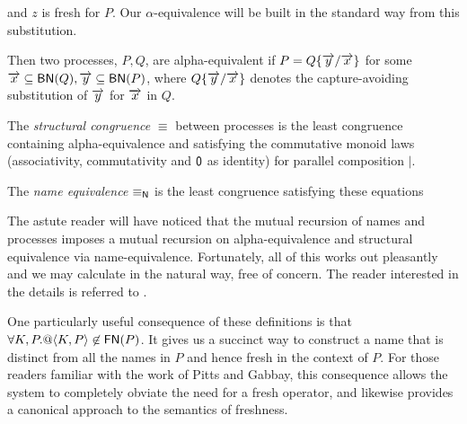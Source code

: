 and $z$ is fresh for $P$. Our $\alpha$-equivalence will be built in
the standard way from this substitution.

\begin{definition}
Then two processes, $P,Q$, are alpha-equivalent if $P = Q\{\overrightarrow{y}/\overrightarrow{x}\}$ for
some $\overrightarrow{x} \subseteq \mathsf{BN}(Q),\overrightarrow{y} \subseteq \mathsf{BN}(P)$, where $Q\{\overrightarrow{y}/\overrightarrow{x}\}$
denotes the capture-avoiding substitution of $\overrightarrow{y}$ for $\overrightarrow{x}$ in $Q$.
\end{definition}

\begin{definition}
  The {\em structural congruence} $\equiv$
  between processes \cite{DBLP:books/daglib/0004377} is the least congruence containing
  alpha-equivalence and satisfying the commutative monoid laws
  (associativity, commutativity and $\mathsf{0}$ as identity) for parallel
  composition $|$.
\end{definition}

\begin{definition}
  The {\em name equivalence} $\mathsf{\equiv_N}$ is the least congruence
  satisfying these equations
\end{definition}

The astute reader will have noticed that the mutual recursion of names
and processes imposes a mutual recursion on alpha-equivalence and
structural equivalence via name-equivalence. Fortunately, all of this
works out pleasantly and we may calculate in the natural way, free of
concern. The reader interested in the details is referred to
\cite{DBLP:journals/entcs/MeredithR05}.

\begin{remark}\label{rem:no_self_referential_names}
  One particularly useful consequence of these definitions is that
  $\forall K,P. \mathsf{@} \langle K,P\rangle \not\in \mathsf{FN}(P)$. It gives us a
  succinct way to construct a name that is distinct from all the names
  in $P$ and hence fresh in the context of $P$. For those readers
  familiar with the work of Pitts and Gabbay, this consequence allows
  the system to completely obviate the need for a fresh operator, and
  likewise provides a canonical approach to the semantics of
  freshness.
\end{remark}

